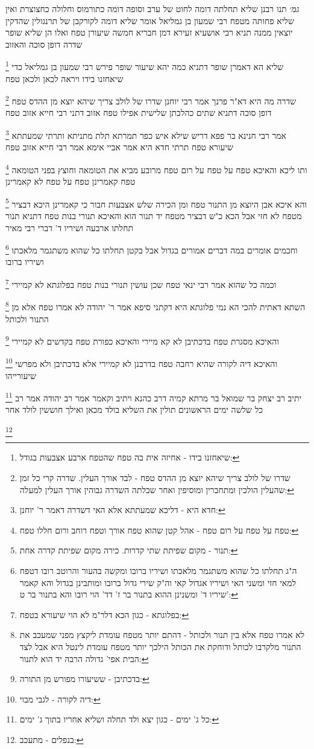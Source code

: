 \documentclass[12pt, openany]{book}
\newcommand{\footnotecomment}[1]{
	\renewcommand\thefootnote{}
	\footnote{#1}}
\newcommand{\commenta}[1]{\footnotecomment{#1}}
\begin{document}
{{{\large\emph{גמ׳}} תנו רבנן שליא תחלתה דומה לחוט של ערב וסופה דומה כתורמוס וחלולה כחצוצרת ואין שליא פחותה מטפח רבי שמעון בן גמליאל אומר שליא דומה לקורקבן של תרנגולין שהדקין יוצאין ממנה 
תניא רבי אושעיא זעירא דמן חבריא חמשה שיעורן טפח ואלו הן שליא שופר שדרה דופן סוכה והאזוב 
\commenta{שיאחזנו בידו - אחיזה אית בה טפח שהטפח ארבע אצבעות בגודל:}
שליא הא דאמרן שופר דתניא כמה יהא שיעור שופר פירש רבי שמעון בן גמליאל כדי שיאחזנו בידו ויראה לכאן ולכאן טפח 
\commenta{שדרו של לולב צריך שיהא יוצא מן ההדס טפח - לבד אורך העלין. שדרה קרי כל זמן שהעלין הולכין ומתחברין ומוסיפין ואחר שכלתה השדרה גבוהין אורך העלין למעלה:}
שדרה מה היא דא"ר פרנך אמר רבי יוחנן שדרו של לולב צריך שיהא יוצא מן ההדס טפח דופן סוכה דתניא שתים כהלכתן שלישית אפילו טפח אזוב דתני רבי חייא אזוב טפח 
\commenta{חדא היא - דליכא שמעתתא אלא האי דשדרה דאמר ר' יוחנן:}
אמר רבי חנינא בר פפא דריש שילא איש כפר תמרתא תלת מתניתא ותרתי שמעתתא שיעורא טפח תרתי חדא היא אמר אביי אימא אמר רבי חייא אזוב טפח 
\commenta{טפח על טפח על רום טפח - אהל קטן שהוא טפח אורך וטפח רוחב ורום חללו טפח:}
ותו ליכא והאיכא טפח על טפח על רום טפח מרובע מביא את הטומאה וחוצץ בפני הטומאה 
טפח קאמרינן טפח על טפח לא קאמרינן 
\commenta{תנור - מקום שפיתת שתי קדרות. כירה מקום שפיתת קדרה אחת:}
והא איכא אבן היוצא מן התנור טפח ומן הכירה שלש אצבעות חבור 
כי קאמרינן היכא דבציר מטפח לא חזי אבל הכא כ"ש דבציר מטפח יד תנור הוא 
והאיכא
תנורי בנות טפח דתניא תנור תחלתו ארבעה ושיריו ד' דברי רבי מאיר 
\commenta{ה"ג תחלתו כל שהוא משתגמר מלאכתו ושיריו ברובו ומקשה בהעור והרוטב רובו דטפח למאי חזי ומשני האי ושיריו אגדול קאי וה"ק שירי גדול ברובו ומותבינן בגדול והא קאמר שיריו ד' ומשנינן ההוא בתנור בר ז' דד' הוי רובו והא בתנור בר ט':}
וחכמים אומרים במה דברים אמורים בגדול אבל בקטן תחלתו כל שהוא משתגמר מלאכתו ושיריו ברובו 
\commenta{בפלוגתא - כגון הכא דלר"מ לא הוי שיעורא בטפח:}
וכמה כל שהוא אמר רבי ינאי טפח שכן עושין תנורי בנות טפח בפלוגתא לא קמיירי 
\commenta{לא אמרו טפח אלא בין תנור ולכותל - דהתם יותר מטפח עומדת ליקצץ מפני שמעכב את התנור מלקרבו לכותל ודוחקת את הכותל הילכך יותר מטפח עומדת לינטל היא אבל לצד הבית אפי' גדולה הרבה יד הוא לתנור:}
השתא דאתית להכי הא נמי פלוגתא היא דקתני סיפא אמר ר' יהודה לא אמרו טפח אלא מן התנור ולכותל 
\commenta{בדכתיבן - ששיעורו מפורש מן התורה:}
והאיכא מסגרת טפח בדכתיבן לא קא מיירי והאיכא כפורת טפח בקדשים לא קמיירי 
\commenta{דיה לקורה - לגבי מבוי:}
והאיכא דיה לקורה שהיא רחבה טפח בדרבנן לא קמיירי אלא בדכתיבן ולא מפרשי שיעורייהו 
\commenta{כל ג' ימים - כגון יצא ולד תחלה ושליא אחריו בתוך ג' ימים:}
יתיב רב יצחק בר שמואל בר מרתא קמיה דרב כהנא ויתיב וקאמר אמר רב יהודה אמר רב כל שלשה ימים הראשונים תולין את השליא בולד מכאן ואילך חוששין לולד אחר 
\commenta{בנפלים - מתעכב:}
}}
\end{document}

